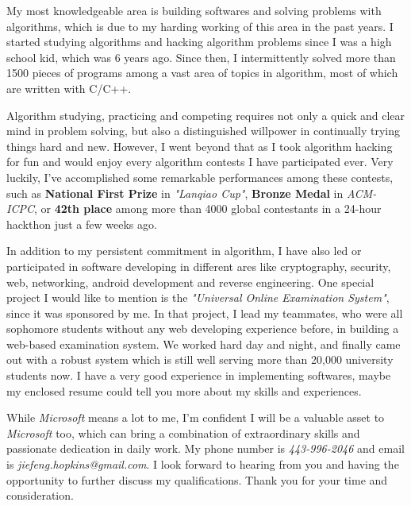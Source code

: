 \documentclass[11pt]{letter} %
\newcommand{\company}{\emph{Microsoft} }
\begin{document}
\begin{letter}{
}
My most knowledgeable area is building softwares and solving problems with algorithms, which is due to my harding working of this area in the past years.  
I started studying algorithms and hacking algorithm problems since I was a high school kid, which was 6 years ago. 
Since then, I intermittently solved more than 1500 pieces of programs among a vast area of topics in algorithm, most of which are written with C/C++.

Algorithm studying, practicing and competing requires not only a quick and clear mind in problem solving, but also a distinguished willpower in continually trying things hard and new.
However, I went beyond that as I took algorithm hacking for fun and would enjoy every algorithm contests I have participated ever.
Very luckily, I've accomplished some remarkable performances among these contests, such as \textbf{National First Prize} in
\emph{"Lanqiao Cup"}, \textbf{Bronze Medal} in \emph{ACM-ICPC}, or \textbf{42th place} among more than 4000 global contestants in a 24-hour hackthon just a few weeks ago.



In addition to my persistent commitment in algorithm, I have also led or participated in software developing in
different ares like cryptography, security, web, networking, android development and reverse engineering. 
One special project I would like to mention is the \emph{"Universal Online Examination System"}, since it was sponsored by me.
In that project, I lead my teammates, who were all sophomore students without any web developing experience before, in
building a web-based examination system. We worked hard day and night, and finally came out with a robust system which is still well serving more than 20,000 university students now.
I have a very good experience in implementing softwares, maybe my enclosed resume could tell you more about my skills
and experiences.

While \company means a lot to me, I'm confident I will be a valuable asset to \company too, which can bring a
combination of extraordinary skills and passionate dedication in daily work. 
My phone number is \emph{443-996-2046} and email is \emph{jiefeng.hopkins@gmail.com}. I look forward to hearing from you and having the opportunity to further discuss my qualifications.  Thank you for your time and consideration.




\end{letter}
\end{document}
